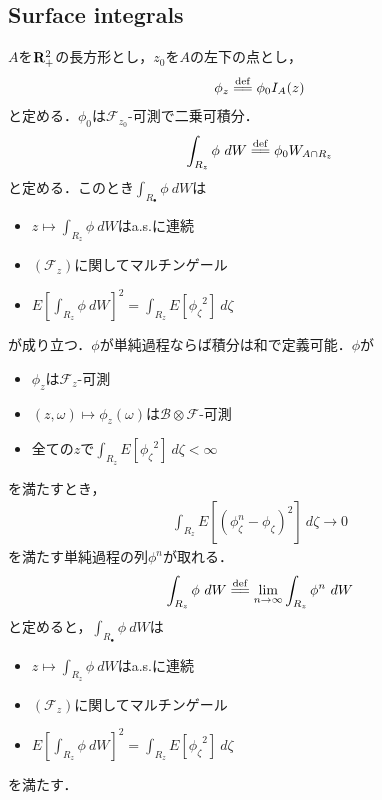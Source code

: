 \subsection{Surface integrals}
	$A$を$\mathbf{R}_{+}^{2}$の長方形とし，$z_{0}$を$A$の左下の点とし，
	\begin{align}
		\phi_{z} \defeq \phi_{0} I_{A}(z)
	\end{align}
	と定める．$\phi_{0}$は$\mathscr{F}_{z_{0}}$-可測で二乗可積分．
	\begin{align}
		\int_{R_{z}} \phi\ dW \defeq \phi_{0} W_{A \cap R_{z}}
	\end{align}
	と定める．このとき$\int_{R_{\bullet}} \phi\ dW$は
	\begin{itemize}
		\item $z \longmapsto \int_{R_{z}} \phi\ dW$はa.s.に連続
		\item $(\mathscr{F}_{z})$に関してマルチンゲール
		\item$E\left[\int_{R_{z}} \phi\ dW\right]^{2} = \int_{R_{z}} E[{\phi_{\zeta}}^{2}]\ d\zeta$
	\end{itemize}
	が成り立つ．$\phi$が単純過程ならば積分は和で定義可能．$\phi$が
	\begin{itemize}
		\item $\phi_{z}$は$\mathscr{F}_{z}$-可測
		\item $(z,\omega) \longmapsto \phi_{z}(\omega)$は$\mathscr{B} \otimes \mathscr{F}$-可測
		\item 全ての$z$で$\int_{R_{z}} E[{\phi_{\zeta}}^{2}]\ d\zeta < \infty$
	\end{itemize}
	を満たすとき，
	\begin{align}
		\int_{R_{z}} E\left[(\phi_{\zeta}^{n} - \phi_{\zeta})^{2}\right]\ d\zeta \longrightarrow 0
	\end{align}
	を満たす単純過程の列$\phi^{n}$が取れる．
	\begin{align}
		\int_{R_{z}} \phi\ dW \defeq \lim_{n \to \infty} \int_{R_{z}} \phi^{n}\ dW
	\end{align}
	と定めると，$\int_{R_{\bullet}} \phi\ dW$は
	\begin{itemize}
		\item $z \longmapsto \int_{R_{z}} \phi\ dW$はa.s.に連続
		\item $(\mathscr{F}_{z})$に関してマルチンゲール
		\item$E\left[\int_{R_{z}} \phi\ dW\right]^{2} = \int_{R_{z}} E[{\phi_{\zeta}}^{2}]\ d\zeta$
	\end{itemize}
	を満たす．
